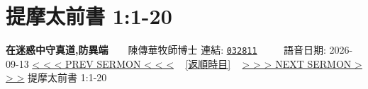 \documentclass{book}
\begin{document}
\section{提摩太前書 1:1-20}
\label{sec:032811}
\textbf{在迷惑中守真道,防異端}~~~~陳傳華牧師博士
\newline
\newline
連結: \href{http://www.church.com.hk/acms/content.asp?site=cdc\&op=show\&type=product\&code=032811\&layout=sermon}{\texttt{032811}} ~~~~ 語音日期: 2026-09-13
\newline
\newline
\hyperref[sec:032810]{\small{< < < PREV SERMON < < <}}
~
\hyperref[sec:index_chronic]{\small{[返順時目]}}
~
\hyperref[sec:032812]{\small{> > > NEXT SERMON > > >}}
\newline
\newline
提摩太前書 1:1-20
\newline
\end{document}
